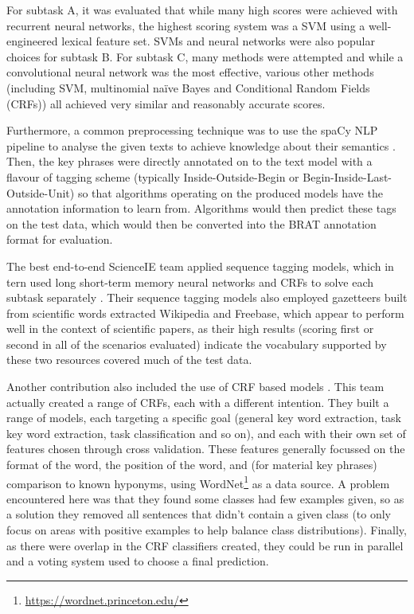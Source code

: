 For subtask A, it was evaluated that while many high scores were achieved with recurrent neural networks, the highest scoring system was a SVM using a well-engineered lexical feature set. SVMs and neural networks were also popular choices for subtask B. For subtask C, many methods were attempted and while a convolutional neural network was the most effective, various other methods (including SVM, multinomial naïve Bayes and Conditional Random Fields (CRFs)) all achieved very similar and reasonably accurate scores.

Furthermore, a common preprocessing technique was to use the spaCy NLP pipeline to analyse the given texts to achieve knowledge about their semantics \cite{Honnibal2015}. Then, the key phrases were directly annotated on to the text model with a flavour of tagging scheme (typically Inside-Outside-Begin or Begin-Inside-Last-Outside-Unit) so that algorithms operating on the produced models have the annotation information to learn from. Algorithms would then predict these tags on the test data, which would then be converted into the BRAT annotation format for evaluation.

The best end-to-end ScienceIE team applied sequence tagging models, which in tern used long short-term memory neural networks and CRFs to solve each subtask separately \cite{Ammar2017}. Their sequence tagging models also employed gazetteers built from scientific words extracted Wikipedia and Freebase, which appear to perform well in the context of scientific papers, as their high results (scoring first or second in all of the scenarios evaluated) indicate the vocabulary supported by these two resources covered much of the test data.

Another contribution also included the use of CRF based models \cite{Marsi2017}. This team actually created a range of CRFs, each with a different intention. They built a range of models, each targeting a specific goal (general key word extraction, task key word extraction, task classification and so on), and each with their own set of features chosen through cross validation. These features generally focussed on the format of the word, the position of the word, and (for material key phrases) comparison to known hyponyms, using WordNet\footnote{\href{https://wordnet.princeton.edu/}{https://wordnet.princeton.edu/}} as a data source. A problem encountered here was that they found some classes had few examples given, so as a solution they removed all sentences that didn't contain a given class (to only focus on areas with positive examples to help balance class distributions). Finally, as there were overlap in the CRF classifiers created, they could be run in parallel and a voting system used to choose a final prediction.

